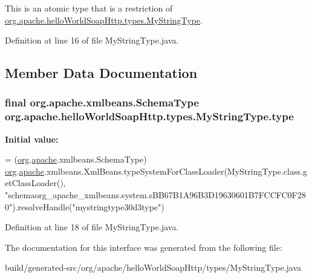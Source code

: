 This is an atomic type that is a restriction of \hyperlink{interfaceorg_1_1apache_1_1hello_world_soap_http_1_1types_1_1_my_string_type}{org.\+apache.\+hello\+World\+Soap\+Http.\+types.\+My\+String\+Type}. 

Definition at line 16 of file My\+String\+Type.\+java.



\subsection{Member Data Documentation}
\hypertarget{interfaceorg_1_1apache_1_1hello_world_soap_http_1_1types_1_1_my_string_type_adaf3e24658ff4d0a15a6649dd7bea1b6}{}
\subsubsection[{type}]{\setlength{\rightskip}{0pt plus 5cm}final org.\+apache.\+xmlbeans.\+Schema\+Type org.\+apache.\+hello\+World\+Soap\+Http.\+types.\+My\+String\+Type.\+type\hspace{0.3cm}{\ttfamily [static]}}\label{interfaceorg_1_1apache_1_1hello_world_soap_http_1_1types_1_1_my_string_type_adaf3e24658ff4d0a15a6649dd7bea1b6}
{\bfseries Initial value\+:}
\begin{DoxyCode}
= (\hyperlink{namespaceorg}{org}.\hyperlink{namespaceorg_1_1apache}{apache}.xmlbeans.SchemaType)
        \hyperlink{namespaceorg}{org}.\hyperlink{namespaceorg_1_1apache}{apache}.xmlbeans.XmlBeans.typeSystemForClassLoader(MyStringType.class.getClassLoader(),
       \textcolor{stringliteral}{"schemaorg\_apache\_xmlbeans.system.sBB67B1A96B3D19630601B7FCCFC0F280"}).resolveHandle(\textcolor{stringliteral}{"mystringtype30d3type"})
\end{DoxyCode}


Definition at line 18 of file My\+String\+Type.\+java.



The documentation for this interface was generated from the following file\+:\begin{DoxyCompactItemize}
\item 
build/generated-\/src/org/apache/hello\+World\+Soap\+Http/types/My\+String\+Type.\+java\end{DoxyCompactItemize}
